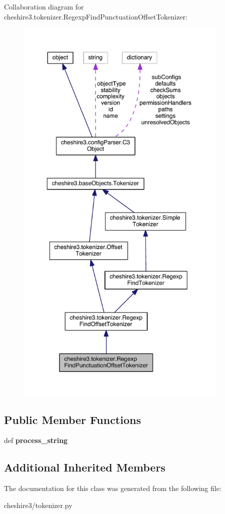 Collaboration diagram for cheshire3.\-tokenizer.\-Regexp\-Find\-Punctuation\-Offset\-Tokenizer\-:
\nopagebreak
\begin{figure}[H]
\begin{center}
\leavevmode
\includegraphics[height=550pt]{classcheshire3_1_1tokenizer_1_1_regexp_find_punctuation_offset_tokenizer__coll__graph}
\end{center}
\end{figure}
\subsection*{Public Member Functions}
\begin{DoxyCompactItemize}
\item 
\hypertarget{classcheshire3_1_1tokenizer_1_1_regexp_find_punctuation_offset_tokenizer_a44657159f6ce36a1cfb73d6124f36ecc}{def {\bfseries process\-\_\-string}}\label{classcheshire3_1_1tokenizer_1_1_regexp_find_punctuation_offset_tokenizer_a44657159f6ce36a1cfb73d6124f36ecc}

\end{DoxyCompactItemize}
\subsection*{Additional Inherited Members}


The documentation for this class was generated from the following file\-:\begin{DoxyCompactItemize}
\item 
cheshire3/tokenizer.\-py\end{DoxyCompactItemize}

